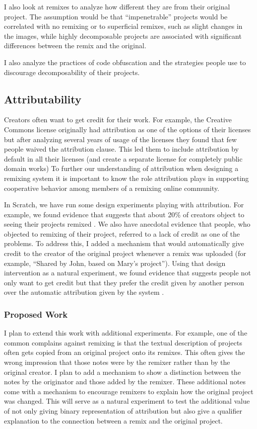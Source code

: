 I also look at remixes to analyze how different they are from their original project. 
The assumption would be that ``impenetrable'' projects would be correlated with no remixing or to superficial remixes, such as slight changes in the images, while highly decomposable projects are associated with significant differences between the remix and the original.

I also analyze the practices of code obfuscation and the strategies people use to discourage decomposability of their projects.

\subsection{Attributability}
Creators often want to get credit for their work. 
For example, the Creative Commons license originally had attribution as one of the options of their licenses but after analyzing several years of usage of the licenses they found that few people waived the attribution clause. 
This led them to include attribution by default in all their licenses (and create a separate license for completely public domain works) \citep{brown_announcing_2004}
To further our understanding of attribution when designing a remixing system it is important to know the role attribution plays in supporting cooperative behavior among members of a remixing online community.

In Scratch, we have run some design experiments playing with attribution. 
For example, we found evidence that suggests that about 20\% of creators object to seeing their projects remixed \citep{hill_responses_2010}.
We also have anecdotal evidence that people, who objected to remixing of their project, referred to a lack of credit as one of the problems.
To address this, I added a mechanism that would automatically give credit to the creator of the original project whenever a remix was uploaded (for example, ``Shared by John, based on Mary's project'').
Using that design intervention as a natural experiment, we found evidence that suggests people not only want to get credit but that they prefer the credit given by another person over the automatic attribution given by the system \cite{monroy-hernandez_computers_2011}. 

\subsubsection{Proposed Work}
I plan to extend this work with additional experiments.
For example, one of the common complains against remixing is that the textual description of projects often gets copied from an original project onto its remixes.
This often gives the wrong impression that those notes were by the remixer rather than by the original creator.
I plan to add a mechanism to show a distinction between the notes by the originator and those added by the remixer.
These additional notes come with a mechanism to encourage remixers to explain how the original project was changed.
This will serve as a natural experiment to test the additional value of not only giving binary representation of attribution but also give a qualifier explanation to the connection between a remix and the original project.

